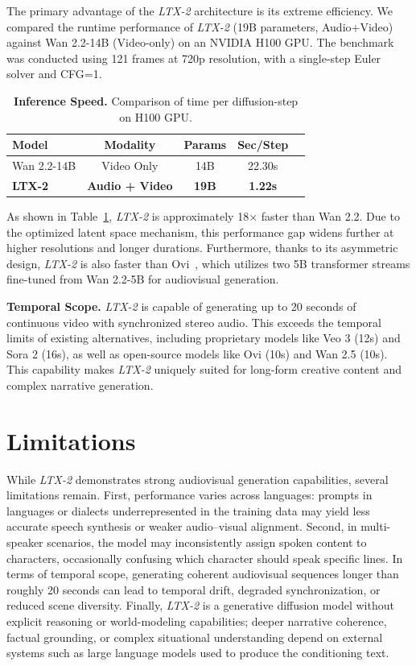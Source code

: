 \documentclass{article}
\begin{document}
The primary advantage of the \textit{LTX-2} architecture is its extreme efficiency. We compared the runtime performance of \textit{LTX-2} (19B parameters, Audio+Video) against Wan 2.2-14B (Video-only) on an NVIDIA H100 GPU. The benchmark was conducted using 121 frames at 720p resolution, with a single-step Euler solver and CFG=1.

\begin{table}[h] \centering \caption{\textbf{Inference Speed.} Comparison of time per diffusion-step on H100 GPU.} \label{tab:performance} \begin{tabular}{@{}l c c c c@{}} \toprule \textbf{Model} & \textbf{Modality} & \textbf{Params} & \textbf{Sec/Step}
\\ \midrule Wan 2.2-14B & Video Only & 14B & 22.30s
\\ \textbf{LTX-2} & \textbf{Audio + Video} & \textbf{19B} & \textbf{1.22s}
\\ \bottomrule \end{tabular} \end{table}

As shown in Table~\ref{tab:performance}, \textit{LTX-2} is approximately 18× faster than Wan 2.2. Due to the optimized latent space mechanism, this performance gap widens further at higher resolutions and longer durations. Furthermore, thanks to its asymmetric design, \textit{LTX-2} is also faster than Ovi~\cite{ovi2025}, which utilizes two 5B transformer streams fine-tuned from Wan 2.2-5B for audiovisual generation.

\textbf{Temporal Scope.} \textit{LTX-2} is capable of generating up to 20 seconds of continuous video with synchronized stereo audio. This exceeds the temporal limits of existing alternatives, including proprietary models like Veo 3 (12s) and Sora 2 (16s), as well as open-source models like Ovi (10s) and Wan 2.5 (10s). This capability makes \textit{LTX-2} uniquely suited for long-form creative content and complex narrative generation.

\section{Limitations}

While \textit{LTX-2} demonstrates strong audiovisual generation capabilities, several limitations remain.
First, performance varies across languages: prompts in languages or dialects underrepresented in the training data may yield less accurate speech synthesis or weaker audio–visual alignment. Second, in multi-speaker scenarios, the model may inconsistently assign spoken content to characters, occasionally confusing which character should speak specific lines.
In terms of temporal scope, generating coherent audiovisual sequences longer than roughly 20 seconds can lead to temporal drift, degraded synchronization, or reduced scene diversity.
Finally, \textit{LTX-2} is a generative diffusion model without explicit reasoning or world-modeling capabilities; deeper narrative coherence, factual grounding, or complex situational understanding depend on external systems such as large language models used to produce the conditioning text.
\end{document}
